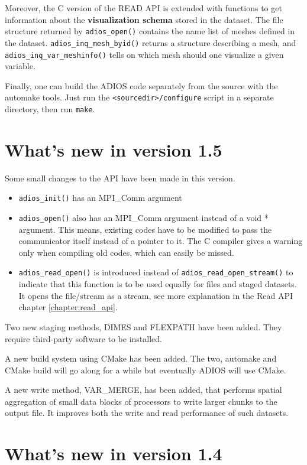 \noindent Moreover, the C version of the READ API is extended with functions to get information about the {\bf visualization schema} stored in the dataset. The file structure returned by \verb+adios_open()+ contains the name list of meshes defined in the dataset. \verb+adios_inq_mesh_byid()+ returns a structure describing a mesh, and \verb+adios_inq_var_meshinfo()+ tells on which mesh should one visualize a given variable.

\vspace{10pt}

\noindent Finally, one can build the ADIOS code separately from the source with the automake tools. Just run the \verb+<sourcedir>/configure+ script in a separate directory, then run \verb+make+.

%
%
\section {What's new in version 1.5}

Some small changes to the API have been made in this version.
\begin{itemize}
\item \verb+adios_init()+ has an MPI\_Comm argument
\item \verb+adios_open()+ also has an MPI\_Comm argument instead of a void * argument. This means, existing codes have to be modified to pass the communicator itself instead of a pointer to it. The C compiler gives a warning only when compiling old codes, which can easily be missed.
\item \verb+adios_read_open()+ is introduced instead of \verb+adios_read_open_stream()+ to indicate that this function is to be used equally for files and staged datasets. It opens the file/stream as a stream, see more explanation in the Read API chapter \ref{chapter:read_api}.
\end{itemize}

Two new staging methods, DIMES and FLEXPATH have been added. They require third-party software to be installed.

A new build system using CMake has been added. The two, automake and CMake build will go along for a while but eventually ADIOS will use CMake.

A new write method, VAR\_MERGE, has been added, that performs spatial aggregation of small data blocks of processors to write larger chunks to the output file. It improves both the write and read performance of such datasets.

%
%
\section {What's new in version 1.4}

